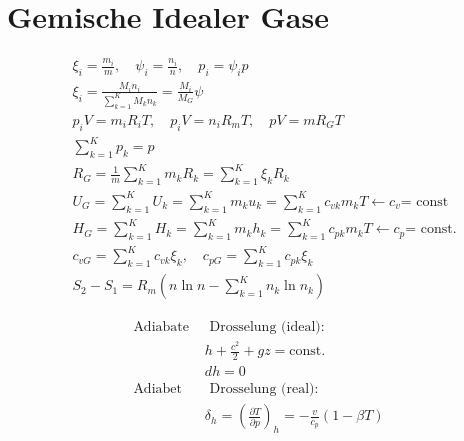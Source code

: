 \documentclass[twocolumn]{article}
\begin{document}
%                                             
                                                            
\section{Gemische Idealer Gase}

\begin{align*}
	&\xi_i
	= \frac{m_i}{m}, \quad \psi_i
	= \frac{n_i}{n}, \quad p_i
	= \psi_ip \\
	&\xi_i
	= \frac{M_i n_i}{\sum_{k
	= 1}^{K} M_kn_k}
	= \frac{M_i}{M_G}\psi  
	\\
	& p_iV
	= m_iR_iT, \quad p_iV
	= n_iR_mT, \quad pV
	= mR_GT \\
	& \sum_{k
	= 1}^{K} p_k
	= p 
	\\
	&R_G
	= \frac{1}{m} \sum_{k=1}^{K} m_kR_k
	= \sum_{k=1}^{K} \xi_k R_k 
	\\
	&U_G
	= \sum_{k=1}^{K} U_k
	= \sum_{k=1}^{K} m_k u_k
	= \sum_{k=1}^{K} c_{vk}m_kT \leftarrow \text{$c_v$
	= const}
	\\
	&H_G
	= \sum_{k=1}^{K} H_k
	= \sum_{k=1}^{K} m_k h_k
	= \sum_{k=1}^{K} c_{pk}m_kT \leftarrow \text{$c_p$
	= const.}
	\\
	&c_{vG}
	= \sum_{k=1}^{K} c_{vk} \xi_k, \quad c_{pG}
	= \sum_{k=1}^{K} c_{pk}\xi_k 
	\\
	&S_2-S_1
	= R_m \left( n \ln n - \sum_{k=1}^{K} n_k \ln n_k \right)
\end{align*}

\begin{align*}
	\text{Adiabate } & \text{ Drosselung (ideal): } \\ 
	& h + \frac{c^2}{2} + gz = \text{const.} \\
	& dh = 0 \\
	\text{Adiabet } & \text{ Drosselung (real): }  \\ 
	& \delta_h = \left(\frac{\partial T}{\partial p}\right)_{h}  = - \frac{v}{c_p}(1-\beta T) \\
\end{align*}
\end{document}
